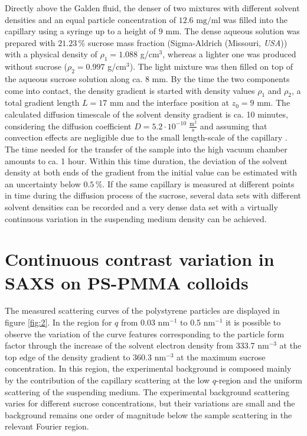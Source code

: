 Directly above the Galden fluid, the denser of two mixtures with different solvent densities and an equal particle concentration of \(12.6 \mbox{ mg/ml} \) was filled into the capillary using a syringe up to a height of  \(9\) mm. The dense aqueous solution was prepared with \( 21.23\,\%\) sucrose mass fraction (Sigma-Aldrich (Missouri, \emph{USA})) with a physical density of \(\rho_1=1.088 \) g/cm\(^3\), whereas a lighter one was produced without sucrose (\(\rho_2=0.997 \) g/cm\(^3\)). The light mixture was then filled on top of the aqueous sucrose solution along ca. \(8\) mm. By the time the two components come into contact, the density gradient is started with density values \(\rho_1\) and \(\rho_2\), a total gradient length \(L=17\) mm and the interface position at \(z_0=9\) mm. The calculated diffusion timescale of the solvent density gradient is ca. 10 minutes, considering the diffusion coefficient \(D=5.2 \cdot 10^{-10} \;\frac{\mbox{m}^2}{\mbox{s}}\) \citet{Uedaira1985,Ribeiro2006} and assuming that convection effects are negligible due to the small length-scale of the capillary \citet{Berberan-Santos1997}. The time needed for the transfer of the sample into the high vacuum chamber amounts to ca. 1 hour. Within this time duration, the deviation of the solvent density at both ends of the gradient from the initial value can be estimated with an uncertainty below \(0.5\,\%\). If the same capillary is measured at different points in time during the diffusion process of the sucrose, several data sets with different solvent densities can be recorded and a very dense data set with a virtually continuous variation in the suspending medium density can be achieved.

\section{Continuous contrast variation in SAXS on PS-PMMA colloids}
The measured scattering curves of the polystyrene particles are displayed in figure \ref{fig:2}. In the region for \(q\) from 0.03 nm\(^{-1}\) to 0.5 nm\(^{-1}\) it is possible to observe the variation of the curve features corresponding to the particle form factor through the increase of the solvent electron density from 333.7 nm\(^{-3}\) at the top edge of the density gradient to 360.3 nm\(^{-3}\) at the maximum sucrose concentration. In this region, the experimental background is composed mainly by the contribution of the capillary scattering at the low $q$-region and the uniform scattering of the suspending medium. The experimental background scattering varies for different sucrose concentrations, but their variations are small and the background remains one order of magnitude below the sample scattering in the relevant Fourier region.

